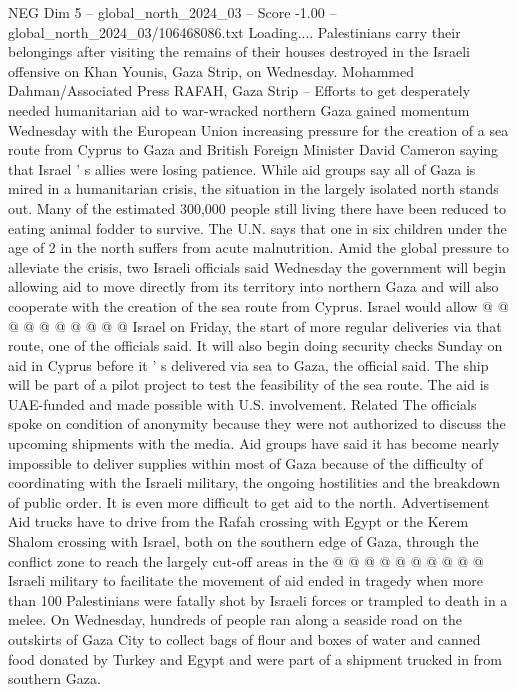 \begin{textsample}{NEG Dim 5 – global\_north\_2024\_03 – Score -1.00 – global\_north\_2024\_03/106468086.txt}  \label{ex:f5_neg_083}
Loading....
Palestinians carry their belongings after visiting the remains of their houses destroyed in the Israeli offensive on Khan Younis, Gaza Strip, on Wednesday.
Mohammed Dahman/Associated Press RAFAH, Gaza Strip -- Efforts to get desperately needed humanitarian aid to war-wracked northern Gaza gained momentum Wednesday with the European Union increasing pressure for the creation of a sea route from Cyprus to Gaza and British Foreign Minister David Cameron saying that Israel ' s allies were losing patience.
While aid groups say all of Gaza is mired in a humanitarian crisis, the situation in the largely isolated north stands out.
Many of the estimated 300,000 people still living there have been reduced to eating animal fodder to survive.
The U.N. says that one in six children under the age of 2 in the north suffers from acute malnutrition.
Amid the global pressure to alleviate the crisis, two Israeli officials said Wednesday the government will begin allowing aid to move directly from its territory into northern Gaza and will also cooperate with the creation of the sea route from Cyprus.
Israel would allow @ @ @ @ @ @ @ @ @ @ Israel on Friday, the start of more regular deliveries via that route, one of the officials said.
It will also begin doing security checks Sunday on aid in Cyprus before it ' s delivered via sea to Gaza, the official said.
The ship will be part of a pilot project to test the feasibility of the sea route.
The aid is UAE-funded and made possible with U.S. involvement.
Related The officials spoke on condition of anonymity because they were not authorized to discuss the upcoming shipments with the media.
Aid groups have said it has become nearly impossible to deliver supplies within most of Gaza because of the difficulty of coordinating with the Israeli military, the ongoing hostilities and the breakdown of public order.
It is even more difficult to get aid to the north.
Advertisement Aid trucks have to drive from the Rafah crossing with Egypt or the Kerem Shalom crossing with Israel, both on the southern edge of Gaza, through the conflict zone to reach the largely cut-off areas in the @ @ @ @ @ @ @ @ @ @ Israeli military to facilitate the movement of aid ended in tragedy when more than 100 Palestinians were fatally shot by Israeli forces or trampled to death in a melee.
On Wednesday, hundreds of people ran along a seaside road on the outskirts of Gaza City to collect bags of flour and boxes of water and canned food donated by Turkey and Egypt and were part of a shipment trucked in from southern Gaza.

\end{textsample}
